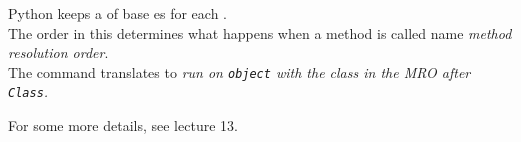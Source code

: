 
\begin{frame}
%
\begin{recapbox}
Python keeps a  of base es for each . \\
The order in this  determines what happens when a method is called \Thus name \emph{method resolution order}. \\
The command  translates to \emph{run on \texttt{object} with the class in the MRO \emph{after} \texttt{Class}.}

\vspace{3pt}
For some more details, see lecture 13.
\end{recapbox}
%
\end{frame}


